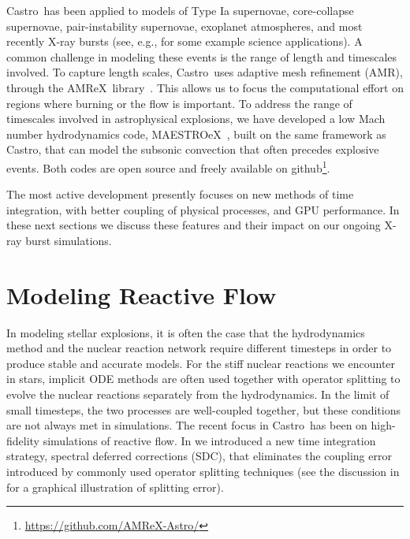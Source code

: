 \documentclass[a4paper]{jpconf}
\newcommand{\maestroex}{{\sffamily MAESTROeX}}
\newcommand{\castro}{{\sffamily Castro}}
\newcommand{\amrex}{{\sffamily AMReX}}
\begin{document}
\castro\ has been applied to models of Type Ia supernovae,
core-collapse supernovae, pair-instability supernovae, exoplanet
atmospheres, and most recently X-ray bursts (see, e.g.,
\cite{castro-ccsne,castro-pairinstability,polin:2019,wdmergerI} for
some example science applications).  A common challenge in modeling
these events is the range of length and timescales involved.  To
capture length scales, \castro\ uses adaptive mesh refinement (AMR), through
the \amrex\ library~\cite{amrex_joss}.  This allows us to focus the
computational effort on regions where burning or the flow is
important.  To address the range of timescales involved in
astrophysical explosions, we have developed a low Mach number
hydrodynamics code, \maestroex~\cite{maestroex}, built on the same
framework as \castro, that can model the subsonic convection that
often precedes explosive events.  Both codes are open source and
freely available on
github\footnote{\url{https://github.com/AMReX-Astro/}}.

The most active development presently focuses on new methods of time
integration, with better coupling of physical processes, and GPU
performance.  In these next sections we discuss these features and
their impact on our ongoing X-ray burst simulations.

\section{Modeling Reactive Flow}

In modeling stellar explosions, it is often the case that the
hydrodynamics method and the nuclear reaction network require
different timesteps in order to produce stable and accurate models.
For the stiff nuclear reactions we encounter in stars, implicit ODE
methods are often used together with operator splitting to evolve the
nuclear reactions separately from the hydrodynamics.  In the limit of
small timesteps, the two processes are well-coupled together, but
these conditions are not always met in simulations.  The recent focus
in \castro\ has been on high-fidelity simulations of reactive flow.
In \cite{castro:sdc} we introduced a new time integration strategy,
spectral deferred corrections (SDC), that eliminates the coupling
error introduced by commonly used operator splitting techniques (see
the discussion in \cite{astronum:2018} for a graphical illustration of
splitting error).
\end{document}
